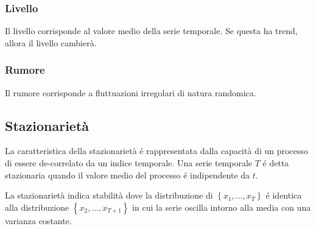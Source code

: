 \subsubsection{Livello}
Il livello corrisponde al valore medio della serie temporale. Se questa ha trend, allora il livello cambierà.

\subsubsection{Rumore}
Il rumore corrisponde a fluttuazioni irregolari di natura randomica.

\subsection{Stazionarietà}
La caratteristica della stazionarietà é rappresentata dalla capacità di un processo di essere de-correlato da un indice temporale. Una serie temporale $T$ é detta stazionaria quando il valore medio del processo é indipendente da $t$. 

La stazionarietà indica stabilità dove la distribuzione di $\left\{ x_1, \ldots, x_T  \right\}$ é identica alla distribuzione $\left\{ x_2, \ldots, x_{T+1}  \right\}$ in cui la serie oscilla intorno alla media con una varianza costante.
